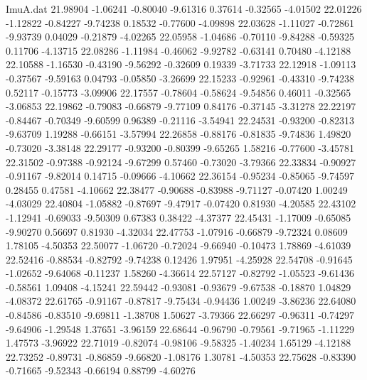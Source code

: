 \begin{filecontents}{ImuA.dat}
  21.98904   -1.06241   -0.80040   -9.61316    0.37614   -0.32565   -4.01502
  22.01226   -1.12822   -0.84227   -9.74238    0.18532   -0.77600   -4.09898
  22.03628   -1.11027   -0.72861   -9.93739    0.04029   -0.21879   -4.02265
  22.05958   -1.04686   -0.70110   -9.84288   -0.59325    0.11706   -4.13715
  22.08286   -1.11984   -0.46062   -9.92782   -0.63141    0.70480   -4.12188
  22.10588   -1.16530   -0.43190   -9.56292   -0.32609    0.19339   -3.71733
  22.12918   -1.09113   -0.37567   -9.59163    0.04793   -0.05850   -3.26699
  22.15233   -0.92961   -0.43310   -9.74238    0.52117   -0.15773   -3.09906
  22.17557   -0.78604   -0.58624   -9.54856    0.46011   -0.32565   -3.06853
  22.19862   -0.79083   -0.66879   -9.77109    0.84176   -0.37145   -3.31278
  22.22197   -0.84467   -0.70349   -9.60599    0.96389   -0.21116   -3.54941
  22.24531   -0.93200   -0.82313   -9.63709    1.19288   -0.66151   -3.57994
  22.26858   -0.88176   -0.81835   -9.74836    1.49820   -0.73020   -3.38148
  22.29177   -0.93200   -0.80399   -9.65265    1.58216   -0.77600   -3.45781
  22.31502   -0.97388   -0.92124   -9.67299    0.57460   -0.73020   -3.79366
  22.33834   -0.90927   -0.91167   -9.82014    0.14715   -0.09666   -4.10662
  22.36154   -0.95234   -0.85065   -9.74597    0.28455    0.47581   -4.10662
  22.38477   -0.90688   -0.83988   -9.71127   -0.07420    1.00249   -4.03029
  22.40804   -1.05882   -0.87697   -9.47917   -0.07420    0.81930   -4.20585
  22.43102   -1.12941   -0.69033   -9.50309    0.67383    0.38422   -4.37377
  22.45431   -1.17009   -0.65085   -9.90270    0.56697    0.81930   -4.32034
  22.47753   -1.07916   -0.66879   -9.72324    0.08609    1.78105   -4.50353
  22.50077   -1.06720   -0.72024   -9.66940   -0.10473    1.78869   -4.61039
  22.52416   -0.88534   -0.82792   -9.74238    0.12426    1.97951   -4.25928
  22.54708   -0.91645   -1.02652   -9.64068   -0.11237    1.58260   -4.36614
  22.57127   -0.82792   -1.05523   -9.61436   -0.58561    1.09408   -4.15241
  22.59442   -0.93081   -0.93679   -9.67538   -0.18870    1.04829   -4.08372
  22.61765   -0.91167   -0.87817   -9.75434   -0.94436    1.00249   -3.86236
  22.64080   -0.84586   -0.83510   -9.69811   -1.38708    1.50627   -3.79366
  22.66297   -0.96311   -0.74297   -9.64906   -1.29548    1.37651   -3.96159
  22.68644   -0.96790   -0.79561   -9.71965   -1.11229    1.47573   -3.96922
  22.71019   -0.82074   -0.98106   -9.58325   -1.40234    1.65129   -4.12188
  22.73252   -0.89731   -0.86859   -9.66820   -1.08176    1.30781   -4.50353
  22.75628   -0.83390   -0.71665   -9.52343   -0.66194    0.88799   -4.60276

\end{filecontents}
